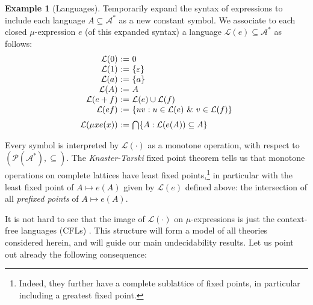 \documentclass[a4paper,10pt]{amsart}
\renewcommand{\epsilon}{\varepsilon}
\newcommand{\df}{:=}
\newcommand{\Pow}{\mathcal P}
\newcommand{\pow}[1]{\Pow(#1)}
\theoremstyle{definition}
\newtheorem{example}[theorem]{Example}
\newcommand{\Alphabet}{\mathcal{A}}
\newcommand{\Lang}{\mathcal L}
\newcommand{\lang}[1]{\Lang(#1)}
\begin{document}
\begin{example}
    [Languages]
    \label{language-model}
    Temporarily expand the syntax of expressions to include each language $A\subseteq \Alphabet^*$ as a new constant symbol.
    We associate to each closed $\mu$-expression $e$ (of this expanded syntax) a language $\lang e \subseteq \Alphabet^*$ as follows:
    \[
    \begin{array}{r@{\ \df \ }l}
         \lang 0 & 0 \\
         \lang 1 & \{\epsilon\} \\
         \lang a & \{a\} \\
         \lang A & A\\
         \lang {e+f} & \lang e \cup \lang f \\
          \lang {ef} & \{ uv : u \in \lang e \ \& \ v \in \lang f\} \\
         \noalign{\medskip}
          \lang {\mu x e(x)} & \bigcap\{ A : \lang {e(A)} \subseteq A \}
    \end{array}
    \]
\end{example}
Every symbol is interpreted by $\lang\cdot$ as a monotone operation, with respect to $(\pow {\Alphabet^*}, \subseteq)$.
The \emph{Knaster-Tarski} fixed point theorem tells us that monotone operations on complete lattices have least fixed points,\footnote{Indeed, they further have a complete sublattice of fixed points, in particular including a greatest fixed point.} in particular with the least fixed point of $A \mapsto e(A)$ given by $\lang e $ defined above: the intersection of all \emph{prefixed points} of $A \mapsto e(A)$.

It is not hard to see that the image of $\lang \cdot$ on $\mu$-expressions is just the context-free languages (CFLs) \cite{Gruska71:cfls-by-mu-exprs}.
This structure will form a model of all theories considered herein, and will guide our main undecidability results.
Let us point out already the following consequence:
\end{document}
